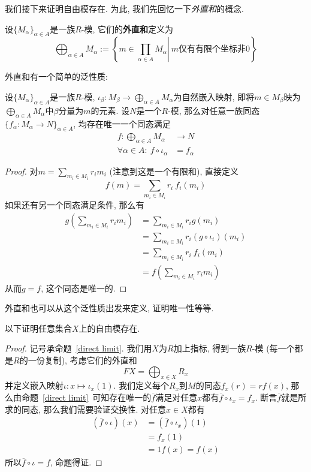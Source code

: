 我们接下来证明自由模存在.
为此, 我们先回忆一下\textit{外直和}的概念.
\begin{defn}
    设$\{M_\alpha\}_{\alpha\in A}$是一族$R$-模, 它们的\textbf{外直和}定义为
    \[\bigoplus_{\alpha\in A}M_\alpha:=\left\{\left.m\in\prod_{\alpha\in A}M_\alpha\right|\ m\text{仅有有限个坐标非}0\right\}\]
\end{defn}

外直和有一个简单的泛性质:
\begin{prop}\label{direct limit}
    设$\{M_\alpha\}_{\alpha\in A}$是一族$R$-模, $\displaystyle\iota_\beta:M_\beta\to\bigoplus_{\alpha\in A}M_\alpha$为自然嵌入映射,
    即将$m\in M_\beta$映为$\displaystyle\bigoplus_{\alpha\in A}M_\alpha$中$\beta$分量为$m$的元素.
    设$N$是一个$R$-模, 那么对任意一族同态$\{f_\alpha:M_\alpha\to N\}_{\alpha\in A}$, 均存在唯一一个同态满足
    \begin{align*}
        f:\bigoplus_{\alpha\in A}M_\alpha&\to N\\
        \forall\alpha\in A:\ f\circ\iota_\alpha&=f_\alpha
    \end{align*}
\end{prop}
\begin{proof}
    对$\displaystyle m=\sum_{m_i\in M_i}r_im_i$ (注意到这是一个有限和), 直接定义
    \[f(m)=\sum_{m_i\in M_i}r_i\ f_i(m_i)\]
    如果还有另一个同态满足条件, 那么有
    \begin{align*}
        g\left(\sum_{m_i\in M_i}r_im_i\right)&=\sum_{m_i\in M_i}r_ig(m_i)\\
        &=\sum_{m_i\in M_i}r_i(g\circ\iota_i)(m_i)\\
        &=\sum_{m_i\in M_i}r_i\ f_i(m_i)\\
        &=f\left(\sum_{m_i\in M_i}r_im_i\right)
    \end{align*}
    从而$g=f$, 这个同态是唯一的.
\end{proof}

外直和也可以从这个泛性质出发来定义, 证明唯一性等等.

以下证明任意集合$X$上的自由模存在.
\begin{proof}
    记号承命题~\ref{direct limit}.
    我们用$X$为$R$加上指标, 得到一族$R$-模 (每一个都是$R$的一份复制), 考虑它们的外直和
    \[FX=\bigoplus_{x\in X}R_x\]
    并定义嵌入映射$\iota:x\mapsto\iota_x(1)$.
    我们定义每个$R_x$到$M$的同态$f_x(r)=rf(x)$, 那么由命题~\ref{direct limit}~可知存在唯一的$\overline{f}$满足对任意$x$都有$\overline{f}\circ\iota_x=f_x$.
    断言$\overline{f}$就是所求的同态, 那么我们需要验证交换性. 对任意$x\in X$都有
    \begin{align*}
        (\overline{f}\circ\iota)(x)&=(\overline{f}\circ\iota_x)(1)\\
        &=f_x(1)\\
        &=1f(x)=f(x)
    \end{align*}
    所以$\overline{f}\circ\iota=f$, 命题得证.
\end{proof}

